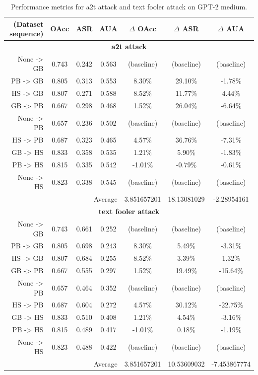 \documentclass{article}
\begin{document}
\begin{table}[ht]
\centering
\caption{Performance metrics for a2t attack and text fooler attack on GPT-2 medium.}
\small
\begin{tabular}{r|ccc|ccc}
\hline
\textbf{(Dataset sequence)} & \textbf{OAcc} & \textbf{ASR} & \textbf{AUA} & \textbf{$\Delta$ OAcc} & \textbf{$\Delta$ ASR} & \textbf{$\Delta$ AUA} \\ \hline
\multicolumn{7}{c}{\textbf{a2t attack}} \\ \hline
None -> GB & 0.743 & 0.242 & 0.563 & (baseline) & (baseline) & (baseline) \\
PB -> GB & 0.805 & 0.313 & 0.553 & 8.30\% & 29.10\% & -1.78\% \\
HS -> GB & 0.807 & 0.271 & 0.588 & 8.52\% & 11.77\% & 4.44\% \\
GB -> PB & 0.667 & 0.298 & 0.468 & 1.52\% & 26.04\% & -6.64\% \\
None -> PB & 0.657 & 0.236 & 0.502 & (baseline) & (baseline) & (baseline) \\
HS -> PB & 0.687 & 0.323 & 0.465 & 4.57\% & 36.76\% & -7.31\% \\
GB -> HS & 0.833 & 0.358 & 0.535 & 1.21\% & 5.90\% & -1.83\% \\
PB -> HS & 0.815 & 0.335 & 0.542 & -1.01\% & -0.79\% & -0.61\% \\
None -> HS & 0.823 & 0.338 & 0.545 & (baseline) & (baseline) & (baseline) \\ \hline
\multicolumn{4}{r|}{Average} & 3.851657201 & 18.13081029 & -2.28954161 \\ \hline
\multicolumn{7}{c}{\textbf{text fooler attack}} \\ \hline
None -> GB & 0.743 & 0.661 & 0.252 & (baseline) & (baseline) & (baseline) \\
PB -> GB & 0.805 & 0.698 & 0.243 & 8.30\% & 5.49\% & -3.31\% \\
HS -> GB & 0.807 & 0.684 & 0.255 & 8.52\% & 3.39\% & 1.32\% \\
GB -> PB & 0.667 & 0.555 & 0.297 & 1.52\% & 19.49\% & -15.64\% \\
None -> PB & 0.657 & 0.464 & 0.352 & (baseline) & (baseline) & (baseline) \\
HS -> PB & 0.687 & 0.604 & 0.272 & 4.57\% & 30.12\% & -22.75\% \\
GB -> HS & 0.833 & 0.510 & 0.408 & 1.21\% & 4.54\% & -3.16\% \\
PB -> HS & 0.815 & 0.489 & 0.417 & -1.01\% & 0.18\% & -1.19\% \\
None -> HS & 0.823 & 0.488 & 0.422 & (baseline) & (baseline) & (baseline) \\ \hline
\multicolumn{4}{r|}{Average} & 3.851657201 & 10.53609032 & -7.453867774 \\ \hline
\end{tabular}
\label{table:gpt2_medium_attack_comparison}
\end{table}
\end{document}
